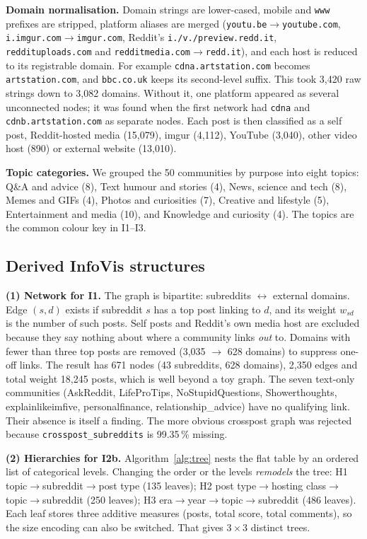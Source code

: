 \textbf{Domain normalisation.} Domain strings are lower-cased, mobile and \texttt{www} prefixes are stripped, platform
aliases are merged (\texttt{youtu.be}$\rightarrow$\texttt{youtube.com}, \texttt{i.imgur.com}$\rightarrow$\texttt{imgur.com},
Reddit's \texttt{i./v./preview.redd.it}, \texttt{reddituploads.com} and \texttt{redditmedia.com}$\rightarrow$\texttt{redd.it}),
and each host is reduced to its registrable domain. For example \texttt{cdna.artstation.com} becomes
\texttt{artstation.com}, and \texttt{bbc.co.uk} keeps its second-level suffix. This took 3,420 raw strings down to 3,082
domains. Without it, one platform appeared as several unconnected nodes; it was found when the first network had
\texttt{cdna} and \texttt{cdnb.artstation.com} as separate nodes. Each post is then classified as a self post,
Reddit-hosted media (15,079), imgur (4,112), YouTube (3,040), other video host (890) or external website (13,010).

\textbf{Topic categories.} We grouped the 50 communities by purpose into eight topics: Q\&A and advice (8),
Text humour and stories (4), News, science and tech (8), Memes and GIFs (4), Photos and curiosities (7), Creative and
lifestyle (5), Entertainment and media (10), and Knowledge and curiosity (4). The topics are the common colour key in
I1--I3.

\subsection{Derived InfoVis structures}
\label{sec:derive}
\textbf{(1) Network for I1.} The graph is bipartite: subreddits $\leftrightarrow$ external domains. Edge $(s,d)$ exists if
subreddit $s$ has a top post linking to $d$, and its weight $w_{sd}$ is the number of such posts. Self posts and Reddit's
own media host are excluded because they say nothing about where a community links \emph{out} to. Domains with fewer
than three top posts are removed (3,035 $\rightarrow$ 628 domains) to suppress one-off links. The result has 671 nodes
(43 subreddits, 628 domains), 2,350 edges and total weight 18,245 posts, which is well beyond a toy graph. The seven
text-only communities (AskReddit, LifeProTips, NoStupidQuestions, Showerthoughts, explainlikeimfive, personalfinance,
relationship\_advice) have no qualifying link. Their absence is itself a finding. The more obvious crosspost graph was
rejected because \texttt{crosspost\_subreddits} is 99.35\,\% missing.

\textbf{(2) Hierarchies for I2b.} Algorithm~\ref{alg:tree} nests the flat table by an ordered list of categorical
levels. Changing the order or the levels \emph{remodels} the tree:
H1 topic$\rightarrow$subreddit$\rightarrow$post type (135 leaves);
H2 post type$\rightarrow$hosting class$\rightarrow$topic$\rightarrow$subreddit (250 leaves);
H3 era$\rightarrow$year$\rightarrow$topic$\rightarrow$subreddit (486 leaves).
Each leaf stores three additive measures (posts, total score, total comments), so the size encoding can also be
switched. That gives $3\times3$ distinct trees.

